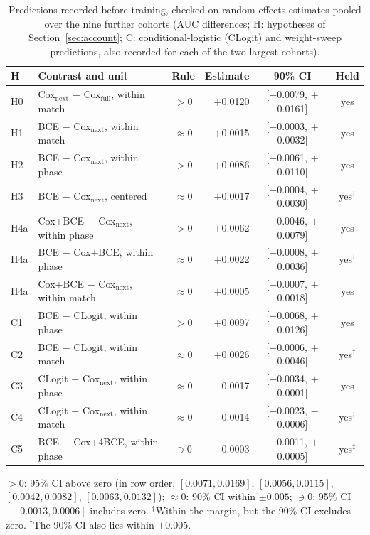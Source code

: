 \begin{table}[b]
\centering\footnotesize
\caption{Predictions recorded before training, checked on random-effects estimates pooled over the nine further cohorts (AUC differences; H: hypotheses of Section~\ref{sec:account}; C: conditional-logistic (CLogit) and weight-sweep predictions, also recorded for each of the two largest cohorts).}
\label{tab:predictions}
\setlength{\tabcolsep}{2.1pt}
\begin{tabular}{llcrcc}
\toprule
H & Contrast and unit & Rule & Estimate & 90\% CI & Held \\
\midrule
H0 & Cox$_{\mathrm{next}}$ $-$ Cox$_{\mathrm{full}}$, within match & $>0$ & $+$0.0120 & [$+$0.0079, $+$0.0161] & yes \\
H1 & BCE $-$ Cox$_{\mathrm{next}}$, within match & $\approx0$ & $+$0.0015 & [$-$0.0003, $+$0.0032] & yes \\
H2 & BCE $-$ Cox$_{\mathrm{next}}$, within phase & $>0$ & $+$0.0086 & [$+$0.0061, $+$0.0110] & yes \\
H3 & BCE $-$ Cox$_{\mathrm{next}}$, centered & $\approx0$ & $+$0.0017 & [$+$0.0004, $+$0.0030] & yes$^\dagger$ \\
H4a & Cox+BCE $-$ Cox$_{\mathrm{next}}$, within phase & $>0$ & $+$0.0062 & [$+$0.0046, $+$0.0079] & yes \\
H4a & BCE $-$ Cox+BCE, within phase & $\approx0$ & $+$0.0022 & [$+$0.0008, $+$0.0036] & yes$^\dagger$ \\
H4a & Cox+BCE $-$ Cox$_{\mathrm{next}}$, within match & $\approx0$ & $+$0.0005 & [$-$0.0007, $+$0.0018] & yes \\
\midrule
C1 & BCE $-$ CLogit, within phase & $>0$ & $+$0.0097 & [$+$0.0068, $+$0.0126] & yes \\
C2 & BCE $-$ CLogit, within match & $\approx0$ & $+$0.0026 & [$+$0.0006, $+$0.0046] & yes$^\dagger$ \\
C3 & CLogit $-$ Cox$_{\mathrm{next}}$, within phase & $\approx0$ & $-$0.0017 & [$-$0.0034, $+$0.0001] & yes \\
C4 & CLogit $-$ Cox$_{\mathrm{next}}$, within match & $\approx0$ & $-$0.0014 & [$-$0.0023, $-$0.0006] & yes$^\dagger$ \\
C5 & BCE $-$ Cox+4BCE, within phase & $\ni0$ & $-$0.0003 & [$-$0.0011, $+$0.0005] & yes$^\ddagger$ \\
\bottomrule
\end{tabular}
\smallskip
\parbox{\columnwidth}{\scriptsize $>0$: 95\% CI above zero (in row order, $[0.0071, 0.0169]$, $[0.0056, 0.0115]$, $[0.0042, 0.0082]$, $[0.0063, 0.0132]$); $\approx0$: 90\% CI within $\pm0.005$; $\ni0$: 95\% CI $[-0.0013, 0.0006]$ includes zero. $^\dagger$Within the margin, but the 90\% CI excludes zero. $^\ddagger$The 90\% CI also lies within $\pm0.005$.}
\end{table}

